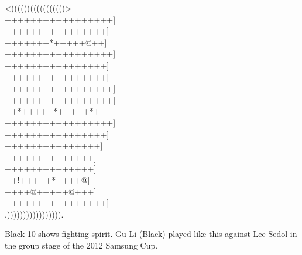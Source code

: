 \documentclass[12pt]{article}
\begin{document}
\begin{minipage}[t]{0.6\textwidth}
\gnos
<(((((((((((((((((>\\
+++++++++++++++++]\\
++++++++++++++++]\\
+++++++*+++++@++]\\
+++++++++++++++++]\\
++++++++++++++++]\\
++++++++++++++++]\\
+++++++++++++++++]\\
+++++++++++++++++]\\
++*+++++*+++++*+]\\
+++++++++++++++++]\\
++++++++++++++++]\\
+++++++++++++++]\\
++++++++++++++]\\
++++++++++++++]\\
++!+++++*++++@]\\
++++@+++++@+++]\\
++++++++++++++++]\\
,))))))))))))))))).\\
\end{minipage}
\begin{minipage}[t]{0.4\textwidth}
\setlength{\parskip}{0.5em}
Black 10 shows fighting spirit. Gu Li (Black) played like this against Lee Sedol in the group stage of the 2012 Samsung Cup.
\end{minipage}
\end{document}
